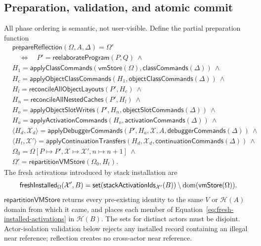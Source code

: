 \subsection{Preparation, validation, and atomic commit}

All phase ordering is semantic, not user-visible.  Define the partial
preparation function
\begin{equation}\label{eq:prepare-reflection}
\begin{split}
 &\mathsf{prepareReflection}(\Omega,A,\Delta)=\Omega'\\[-1mm]
 &\quad\Longleftrightarrow\quad
 P'=\mathsf{reelaborateProgram}(P,Q)\ \land\\
 &H_1=\mathsf{applyClassCommands}
       (\mathsf{vmStore}(\Omega),\mathsf{classCommands}(\Delta))\ \land\\
 &H_c=\mathsf{applyObjectClassCommands}
       (H_1,\mathsf{objectClassCommands}(\Delta))\ \land\\
 &H_l=\mathsf{reconcileAllObjectLayouts}(P',H_c)\ \land\\
 &H_n=\mathsf{reconcileAllNestedCaches}(P',H_l)\ \land\\
 &H_o=\mathsf{applyObjectSlotWrites}
       (P',H_n,\mathsf{objectSlotCommands}(\Delta))\ \land\\
 &H_a=\mathsf{applyActivationCommands}
       (H_o,\mathsf{activationCommands}(\Delta))\ \land\\
 &\langle H_d,\mathcal X_d\rangle=
     \mathsf{applyDebuggerCommands}
       (P',H_a,\mathcal X,A,\mathsf{debuggerCommands}(\Delta))\ \land\\
 &\langle H_t,\mathcal X'\rangle=
     \mathsf{applyContinuationTransfers}
       (H_d,\mathcal X_d,\mathsf{continuationCommands}(\Delta))\ \land\\
 &\Omega_0=\Omega[P\mapsto P',\mathcal X\mapsto\mathcal X',n\mapsto n+1]\ \land\\
 &\Omega'=\mathsf{repartitionVMStore}(\Omega_0,H_t).
\end{split}
\end{equation}
The fresh activations introduced by stack installation are
\begin{equation}\label{eq:fresh-installed-activations}
 \mathsf{freshInstalled}_{\Omega}(\mathcal X',B)=
 \mathsf{set}(\mathsf{stackActivationIds}_{\mathcal X'}(B))
 \setminus\mathop{\mathrm{dom}}(\mathsf{vmStore}(\Omega)).
\end{equation}
$\mathsf{repartitionVMStore}$ returns every pre-existing identity to the same
$V$ or $\mathcal H(A)$ domain from which it came, and places each member of
Equation~\eqref{eq:fresh-installed-activations} in $\mathcal H(B)$.  The sets
for distinct actors must be disjoint.  Actor-isolation validation below rejects
any installed record containing an illegal near reference; reflection creates
no cross-actor near reference.

